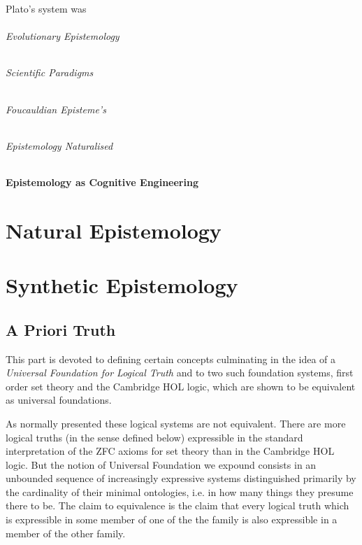 \documentclass[10pt,titlepage]{book}
\begin{document}
Plato's system was 



\paragraph{Evolutionary Epistemology}

\paragraph{Scientific Paradigms}

\paragraph{Foucauldian Episteme's}

\paragraph{Epistemology Naturalised}

\subsection{Epistemology as Cognitive Engineering}

\part{Natural Epistemology}

\part{Synthetic Epistemology}

\chapter{A Priori Truth}

This part is devoted to defining certain concepts culminating in the idea of a \emph{Universal Foundation for Logical Truth} and to two such foundation systems, first order set theory and the Cambridge HOL logic, which are shown to be equivalent as universal foundations.

As normally presented these logical systems are not equivalent.
There are more logical truths (in the sense defined below) expressible in the standard interpretation of the ZFC axioms for set theory than in the Cambridge HOL logic.
But the notion of Universal Foundation we expound consists in an unbounded sequence of increasingly expressive systems distinguished primarily by the cardinality of their minimal ontologies, i.e. in how many things they presume there to be.
The claim to equivalence is the claim that every logical truth which is expressible in some member of one of the the family is also expressible in a member of the other family.
\end{document}
